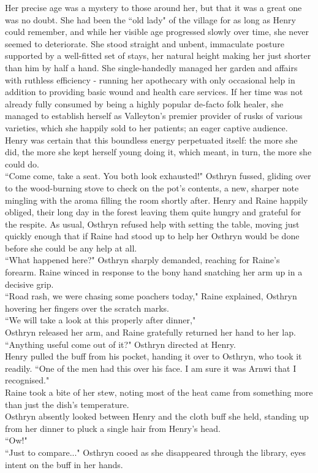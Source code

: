 Her precise age was a mystery to those around her, but that it was a great one was no doubt. 
She had been the ``old lady" of the village for as long as Henry could remember, and while her visible age progressed slowly over time, she never seemed to deteriorate.
She stood straight and unbent, immaculate posture supported by a well-fitted set of stays, her natural height making her just shorter than him by half a hand.
She single-handedly managed her garden and affairs with ruthless efficiency - running her apothecary with only occasional help in addition to providing basic wound and health care services.
If her time was not already fully consumed by being a highly popular de-facto folk healer, she managed to establish herself as Valleyton's premier provider of rusks of various varieties, which she happily sold to her patients; an eager captive audience.\\

Henry was certain that this boundless energy perpetuated itself: the more she did, the more she kept herself young doing it, which meant, in turn, the more she could do.\\

``Come come, take a seat. You both look exhausted!" Osthryn fussed, gliding over to the wood-burning stove to check on the pot's contents, a new, sharper note mingling with the aroma filling the room shortly after.
Henry and Raine happily obliged, their long day in the forest leaving them quite hungry and grateful for the respite.
As usual, Osthryn refused help with setting the table, moving just quickly enough that if Raine had stood up to help her Osthryn would be done before she could be any help at all.\\

``What happened here?" Osthryn sharply demanded, reaching for Raine's forearm. Raine winced in response to the bony hand snatching her arm up in a decisive grip.\\ 
``Road rash, we were chasing some poachers today," Raine explained, Osthryn hovering her fingers over the scratch marks.\\
``We will take a look at this properly after dinner,"\\
Osthryn released her arm, and Raine gratefully returned her hand to her lap.\\
``Anything useful come out of it?" Osthryn directed at Henry.\\
Henry pulled the buff from his pocket, handing it over to Osthryn, who took it readily. 
``One of the men had this over his face. I am sure it was Arnwi that I recognised."\\
Raine took a bite of her stew, noting most of the heat came from something more than just the dish's temperature.\\
Osthryn absently looked between Henry and the cloth buff she held, standing up from her dinner to pluck a single hair from Henry's head.\\
``Ow!"\\
``Just to compare..." Osthryn cooed as she disappeared through the library, eyes intent on the buff in her hands.\\

